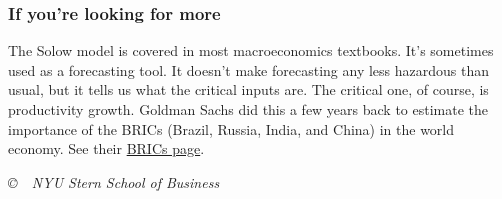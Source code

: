 \documentclass[letterpaper,12pt]{article}
\begin{document}

\subsubsection*{If you're looking for more}

The Solow model is covered in most macroeconomics textbooks.
%
It's sometimes used as a forecasting tool.
It doesn't make forecasting any less hazardous than usual, 
but it tells us what the critical inputs are.
The critical one, of course, is productivity growth.
Goldman Sachs did this a few years back to estimate the importance of
the BRICs (Brazil, Russia, India, and China) in the world economy.  
See their 
\href{http://www2.goldmansachs.com/our-thinking/brics/brics-at-8/index.html}
{BRICs page}.


\vfill \centerline{\it \copyright \ \number\year \  NYU Stern
School of Business}
\end{document}
